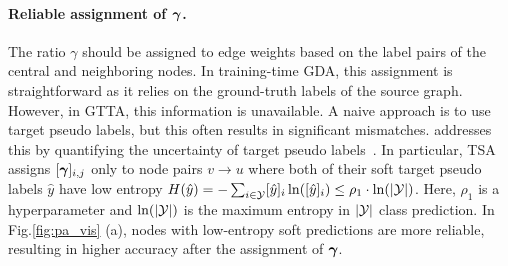\paragraph{Reliable assignment of $\boldsymbol{\gamma}$.} 
The ratio $\gamma$ should be assigned to edge weights based on the label pairs of the central and neighboring nodes. 
In training-time GDA, this assignment is straightforward as it relies on the ground-truth labels of the source graph. However, in GTTA, this information is unavailable. A naive approach is to use target pseudo labels, but this often results in significant mismatches. \proj addresses this by quantifying the uncertainty of target pseudo labels~\cite{zhang2019bayesian,stadler2021graph,hsu2022graph}. In particular, TSA assigns $[\boldsymbol{\gamma}]_{i,j}$ only to node pairs $v\rightarrow u$ where both of their soft target pseudo labels $\hat{y}$ have low entropy $H(\hat{y})=-\sum_{i\in {\mathcal{Y}}}[\hat{y}]_i\ln([\hat{y}]_i)\leq\rho_1 \cdot \ln ( |{\mathcal{Y}}|)$. Here, $\rho_1$ is a hyperparameter and $ \ln( |{\mathcal{Y}}|)$ is the maximum entropy in $|{\mathcal{Y}}|$ class prediction. In Fig.\ref{fig:pa_vis} (a), nodes with low-entropy soft predictions are more reliable, resulting in higher accuracy after the assignment of $\boldsymbol{\gamma}$. 



